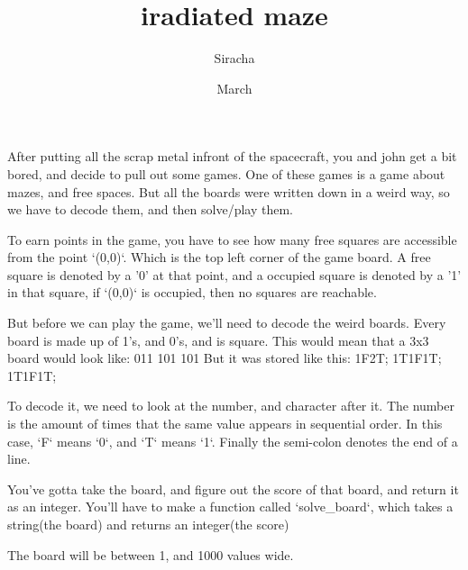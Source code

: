 \documentclass{article}
\title{iradiated maze}
\author{Siracha}
\date{March}
\begin{document}
After putting all the scrap metal infront of the spacecraft, you and john get a bit bored, and decide to pull out some games.
One of these games is a game about mazes, and free spaces.
But all the boards were written down in a weird way, so we have to decode them, and then solve/play them.

To earn points in the game, you have to see how many free squares are accessible from the point `(0,0)`. Which is the top left corner of the game board. A free square is denoted by a '0' at that point, and a occupied square is denoted by a '1' in that square, if `(0,0)` is occupied, then no squares are reachable.

But before we can play the game, we'll need to decode the weird boards. Every board is made up of 1's, and 0's, and is square. This would mean that a 3x3 board would look like:
011
101
101
But it was stored like this:
1F2T;
1T1F1T;
1T1F1T;

To decode it, we need to look at the number, and character after it. The number is the amount of times that the same value appears in sequential order. In this case, `F` means `0`, and `T` means `1`. Finally the semi-colon denotes the end of a line.

You've gotta take the board, and figure out the score of that board, and return it as an integer.
You'll have to make a function called `solve_board`, which takes a string(the board) and returns an integer(the score)

The board will be between 1, and 1000 values wide.
\end{document}
